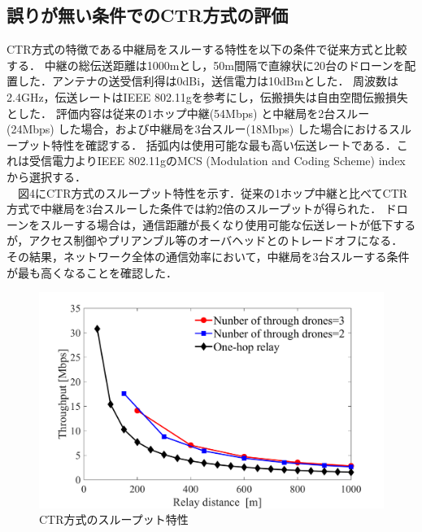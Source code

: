 \documentclass[a4paper,10pt]{ltjsarticle}
\begin{document}
\subsection{誤りが無い条件でのCTR方式の評価}
CTR方式の特徴である中継局をスルーする特性を以下の条件で従来方式と比較する．
中継の総伝送距離は1000mとし，50m間隔で直線状に20台のドローンを配置した．アンテナの送受信利得は0dBi，送信電力は10dBmとした．
周波数は2.4GHz，伝送レートはIEEE 802.11gを参考にし，伝搬損失は自由空間伝搬損失とした．
評価内容は従来の1ホップ中継(54Mbps) と中継局を2台スルー(24Mbps) した場合，および中継局を3台スルー(18Mbps) した場合におけるスループット特性を確認する．
括弧内は使用可能な最も高い伝送レートである．これは受信電力よりIEEE 802.11gのMCS (Modulation and Coding Scheme) indexから選択する．
\\　図4にCTR方式のスループット特性を示す．従来の1ホップ中継と比べてCTR方式で中継局を3台スルーした条件では約2倍のスループットが得られた．
ドローンをスルーする場合は，通信距離が長くなり使用可能な伝送レートが低下するが，アクセス制御やプリアンブル等のオーバヘッドとのトレードオフになる．
その結果，ネットワーク全体の通信効率において，中継局を3台スルーする条件が最も高くなることを確認した．
\begin{figure}[H]
  \centering
  \includegraphics[width=\linewidth]{fig4.pdf} 
  \caption{CTR方式のスループット特性}
  \label{fig:throughput_through} 
\end{figure}
\end{document}
